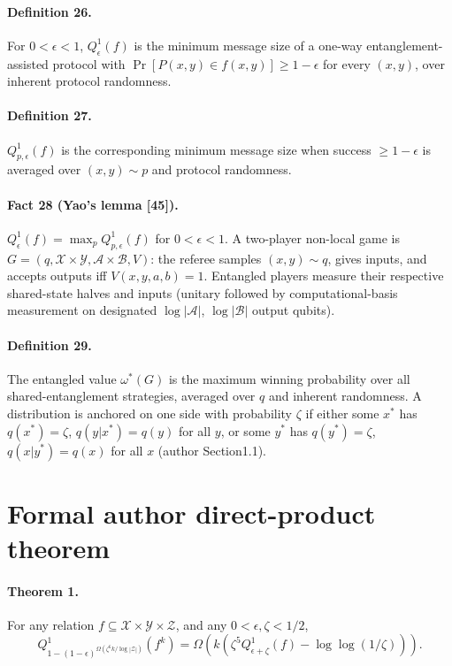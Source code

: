 \documentclass[10pt,a4paper]{article}
\begin{document}
\paragraph{Definition 26.} For $0<\epsilon<1$, $Q^1_\epsilon(f)$ is the minimum message size of a one-way entanglement-assisted protocol with $\Pr[P(x,y)\in f(x,y)]\ge1-\epsilon$ for every $(x,y)$, over inherent protocol randomness.
\paragraph{Definition 27.} $Q^1_{p,\epsilon}(f)$ is the corresponding minimum message size when success $\ge1-\epsilon$ is averaged over $(x,y)\sim p$ and protocol randomness.
\paragraph{Fact 28 (Yao's lemma [45]).} $Q^1_\epsilon(f)=\max_pQ^1_{p,\epsilon}(f)$ for $0<\epsilon<1$.
A two-player non-local game is $G=(q,\mathcal X\times\mathcal Y,\mathcal A\times\mathcal B,V)$: the referee samples $(x,y)\sim q$, gives inputs, and accepts outputs iff $V(x,y,a,b)=1$. Entangled players measure their respective shared-state halves and inputs (unitary followed by computational-basis measurement on designated $\log|\mathcal A|$, $\log|\mathcal B|$ output qubits).
\paragraph{Definition 29.} The entangled value $\omega^*(G)$ is the maximum winning probability over all shared-entanglement strategies, averaged over $q$ and inherent randomness. A distribution is anchored on one side with probability $\zeta$ if either some $x^*$ has $q(x^*)=\zeta$, $q(y|x^*)=q(y)$ for all $y$, or some $y^*$ has $q(y^*)=\zeta$, $q(x|y^*)=q(x)$ for all $x$ (author Section1.1).

\section*{Formal author direct-product theorem}
\paragraph{Theorem 1.} For any relation $f\subseteq\mathcal X\times\mathcal Y\times\mathcal Z$, and any $0<\epsilon,\zeta<1/2$,
\[Q^1_{1-(1-\epsilon)^{\Omega(\zeta^6k/\log|\mathcal Z|)}}(f^k)=\Omega\!\left(k\left(\zeta^5Q^1_{\epsilon+\zeta}(f)-\log\log(1/\zeta)\right)\right).\]
\end{document}
